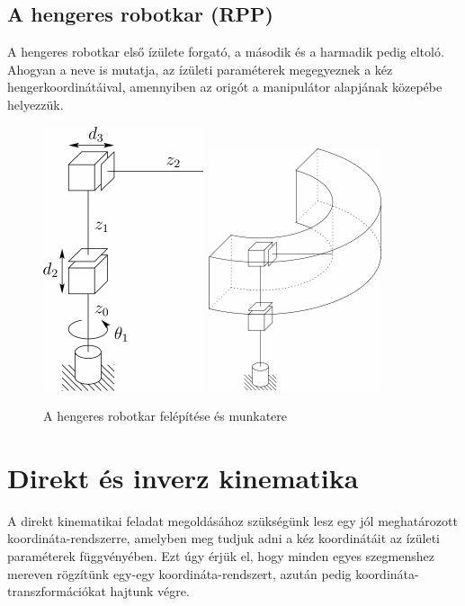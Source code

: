 \documentclass[12pt,a4paper]{report}
\theoremstyle{remark}
\theoremstyle{definition}
\begin{document}
\subsection{A hengeres robotkar (RPP)}
A hengeres robotkar első ízülete forgató, a második és a harmadik pedig eltoló. Ahogyan a neve is mutatja, az 
ízületi paraméterek megegyeznek a kéz hengerkoordinátáival, amennyiben az origót a manipulátor alapjának közepébe 
helyezzük.
\begin{figure}[h]
\centering
\includegraphics[width=0.25\linewidth]{./images/Cylindrical_manipulator}\hspace{1cm}
\includegraphics[width=0.35\linewidth]{./images/Cylindrical_workspace}
\caption{A hengeres robotkar felépítése és munkatere}
\end{figure}

\section{Direkt és inverz kinematika}
A direkt kinematikai feladat megoldásához szükségünk lesz egy jól meghatározott koordináta-rendszerre, amelyben meg 
tudjuk adni a kéz koordinátáit az ízületi paraméterek függvényében. Ezt úgy érjük el, hogy minden egyes szegmenshez 
mereven rögzítünk egy-egy koordináta-rendszert, azután pedig koordináta-transzformációkat hajtunk végre. 
\end{document}
